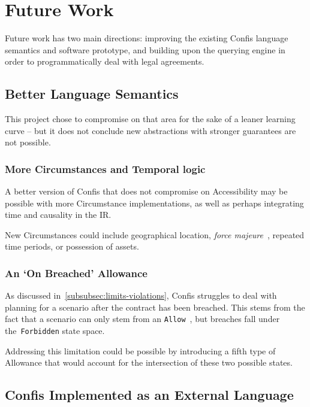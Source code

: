 \section{Future Work}\label{sec:future-work}

Future work has two main directions: improving the existing Confis language semantics and software prototype, and building upon the querying engine in order to programmatically deal with legal agreements.

\subsection{Better Language Semantics}\label{subsec:future:better-language-semantics}

This project chose to compromise on that area for the sake of a leaner learning curve -- but it does not conclude new abstractions with stronger guarantees are not possible.

\subsubsection{More Circumstances and Temporal logic}\label{subsubsec:future:more-circumstances-and-temporal-logic}
A better version of Confis that does not compromise on Accessibility may be possible with more Circumstance implementations, as well as perhaps integrating time and causality in the IR\@.

New Circumstances could include geographical location, \emph{force majeure}~\cite{forceMajeureDefinition}, repeated time periods, or possession of assets.

\subsubsection{An `On Breached' Allowance}

As discussed in~\autoref{subsubsec:limits-violations}, Confis struggles to deal with planning for a scenario after the contract has been breached.
This stems from the fact that a scenario can only stem from an \texttt{Allow}~, but breaches fall under the~\texttt{Forbidden} state space.

Addressing this limitation could be possible by introducing a fifth type of Allowance that would account for the intersection of these two possible states.

\subsection{Confis Implemented as an External Language}\label{subsec:confis-as-external-language}

